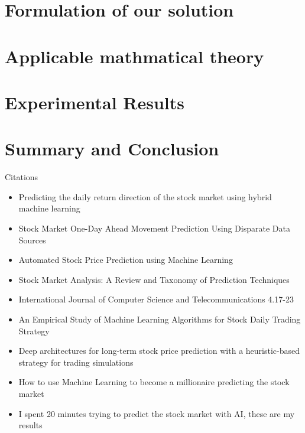\documentclass[conference]{IEEEtran}
\begin{document}

\section{Formulation of our solution}

\section{Applicable mathmatical theory}

\section{Experimental Results}

\section{Summary and Conclusion}


Citations
\begin{itemize}
\item Predicting the daily return direction of the stock market using hybrid machine learning\cite{DailyReturnDirection}
\item Stock Market One-Day Ahead Movement Prediction Using Disparate Data Sources\cite {Onedayahead}
\item Automated Stock Price Prediction using Machine Learning \cite{AutomatedPrediction}
\item Stock Market Analysis: A Review and Taxonomy of Prediction Techniques \cite{TaxonomyofPrediction}
\item International Journal of Computer Science and Telecommunications 4.17-23 \cite {MLModelPrediction}
\item An Empirical Study of Machine Learning Algorithms for Stock Daily Trading Strategy \cite{EmpiricalStudy}
\item Deep architectures for long-term stock price prediction with a heuristic-based strategy for trading simulations \cite{LongTermPricePrediction}
\item How to use Machine Learning to become a millionaire predicting the stock market \cite{WebBecomeMillionaire}
\item I spent 20 minutes trying to predict the stock market with AI, these are my results \cite{20MinStockPredict}
\end{itemize}
\end{document}
